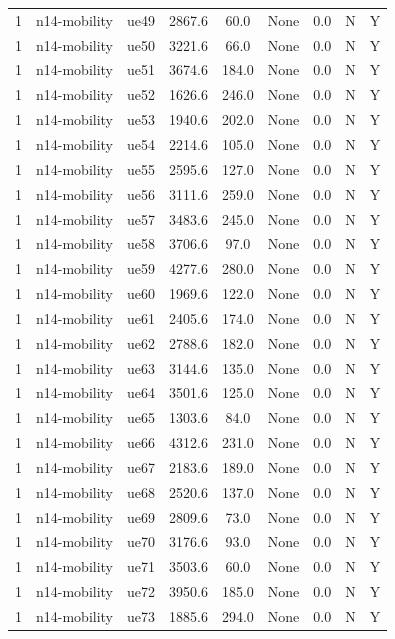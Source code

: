 \begin{table}[ht]
\begin{tabular}{|c|c|c|c|c|c|c|c|c|}
1 & n14-mobility & ue49 & 2867.6 & 60.0 & None & 0.0 & N & Y \\
1 & n14-mobility & ue50 & 3221.6 & 66.0 & None & 0.0 & N & Y \\
1 & n14-mobility & ue51 & 3674.6 & 184.0 & None & 0.0 & N & Y \\
1 & n14-mobility & ue52 & 1626.6 & 246.0 & None & 0.0 & N & Y \\
1 & n14-mobility & ue53 & 1940.6 & 202.0 & None & 0.0 & N & Y \\
1 & n14-mobility & ue54 & 2214.6 & 105.0 & None & 0.0 & N & Y \\
1 & n14-mobility & ue55 & 2595.6 & 127.0 & None & 0.0 & N & Y \\
1 & n14-mobility & ue56 & 3111.6 & 259.0 & None & 0.0 & N & Y \\
1 & n14-mobility & ue57 & 3483.6 & 245.0 & None & 0.0 & N & Y \\
1 & n14-mobility & ue58 & 3706.6 & 97.0 & None & 0.0 & N & Y \\
1 & n14-mobility & ue59 & 4277.6 & 280.0 & None & 0.0 & N & Y \\
1 & n14-mobility & ue60 & 1969.6 & 122.0 & None & 0.0 & N & Y \\
1 & n14-mobility & ue61 & 2405.6 & 174.0 & None & 0.0 & N & Y \\
1 & n14-mobility & ue62 & 2788.6 & 182.0 & None & 0.0 & N & Y \\
1 & n14-mobility & ue63 & 3144.6 & 135.0 & None & 0.0 & N & Y \\
1 & n14-mobility & ue64 & 3501.6 & 125.0 & None & 0.0 & N & Y \\
1 & n14-mobility & ue65 & 1303.6 & 84.0 & None & 0.0 & N & Y \\
1 & n14-mobility & ue66 & 4312.6 & 231.0 & None & 0.0 & N & Y \\
1 & n14-mobility & ue67 & 2183.6 & 189.0 & None & 0.0 & N & Y \\
1 & n14-mobility & ue68 & 2520.6 & 137.0 & None & 0.0 & N & Y \\
1 & n14-mobility & ue69 & 2809.6 & 73.0 & None & 0.0 & N & Y \\
1 & n14-mobility & ue70 & 3176.6 & 93.0 & None & 0.0 & N & Y \\
1 & n14-mobility & ue71 & 3503.6 & 60.0 & None & 0.0 & N & Y \\
1 & n14-mobility & ue72 & 3950.6 & 185.0 & None & 0.0 & N & Y \\
1 & n14-mobility & ue73 & 1885.6 & 294.0 & None & 0.0 & N & Y \\

\end{tabular}
\end{table}
